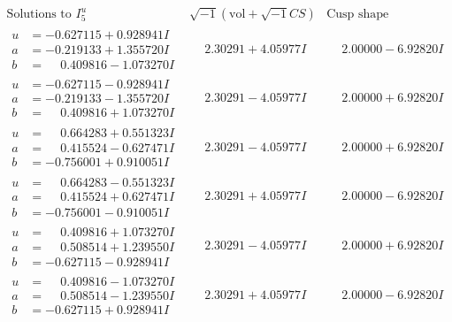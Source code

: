 \documentclass[1p]{elsarticle_modified}
\theoremstyle{definition}
\newcommand{\I}{\sqrt{-1}}
\begin{document}
$$\begin{array}{c|c|c}  
\text{Solutions to }I^u_{5}& \I (\text{vol} + \sqrt{-1}CS) & \text{Cusp shape}\\
 \hline 
\begin{aligned}
u &= -0.627115 + 0.928941 I \\
a &= -0.219133 + 1.355720 I \\
b &= \phantom{-}0.409816 - 1.073270 I\end{aligned}
 & \phantom{-}2.30291 + 4.05977 I & \phantom{-}2.00000 - 6.92820 I \\ \hline\begin{aligned}
u &= -0.627115 - 0.928941 I \\
a &= -0.219133 - 1.355720 I \\
b &= \phantom{-}0.409816 + 1.073270 I\end{aligned}
 & \phantom{-}2.30291 - 4.05977 I & \phantom{-}2.00000 + 6.92820 I \\ \hline\begin{aligned}
u &= \phantom{-}0.664283 + 0.551323 I \\
a &= \phantom{-}0.415524 - 0.627471 I \\
b &= -0.756001 + 0.910051 I\end{aligned}
 & \phantom{-}2.30291 - 4.05977 I & \phantom{-}2.00000 + 6.92820 I \\ \hline\begin{aligned}
u &= \phantom{-}0.664283 - 0.551323 I \\
a &= \phantom{-}0.415524 + 0.627471 I \\
b &= -0.756001 - 0.910051 I\end{aligned}
 & \phantom{-}2.30291 + 4.05977 I & \phantom{-}2.00000 - 6.92820 I \\ \hline\begin{aligned}
u &= \phantom{-}0.409816 + 1.073270 I \\
a &= \phantom{-}0.508514 + 1.239550 I \\
b &= -0.627115 - 0.928941 I\end{aligned}
 & \phantom{-}2.30291 - 4.05977 I & \phantom{-}2.00000 + 6.92820 I \\ \hline\begin{aligned}
u &= \phantom{-}0.409816 - 1.073270 I \\
a &= \phantom{-}0.508514 - 1.239550 I \\
b &= -0.627115 + 0.928941 I\end{aligned}
 & \phantom{-}2.30291 + 4.05977 I & \phantom{-}2.00000 - 6.92820 I \\ \hline\begin{aligned}

\end{aligned}
\end{array}$$
\end{document}
